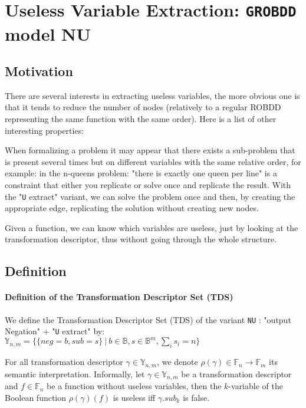 \documentclass[a4paper,10pt]{article}
\newcommand{\B}{\mathbb{B}}
\newcommand{\F}{\mathbb{F}}
\newcommand{\Y}{\mathbb{Y}}
\newcommand{\uextract}{"\texttt{U} extract"}
\newcommand{\GroBdd}{\texttt{GROBDD}}
\begin{document}
\section{Useless Variable Extraction: \GroBdd{} model NU}

\subsection{Motivation}

There are several interests in extracting useless variables, the more obvious one is that it tends to reduce the number of nodes (relatively to a regular ROBDD representing the same function with the same order).
Here is a list of other interesting properties: \begin{compactitem}
\item When formalizing a problem it may appear that there exists a sub-problem that is present several times but on different variables with the same relative order, for example: in the n-queens problem: "there is exactly one queen per line" is a constraint that either you replicate or solve once and replicate the result.
With the \uextract{} variant, we can solve the problem once and then, by creating the appropriate edge, replicating the solution without creating new nodes.
\item Given a function, we can know which variables are useless, just by looking at the transformation descriptor, thus without going through the whole structure.
\end{compactitem}

\subsection{Definition}

\paragraph{Definition of the Transformation Descriptor Set (TDS)}

We define the Transformation Descriptor Set (TDS) of the variant \texttt{NU} : "output Negation" + \uextract{} by: $\Y_{n, m} = \{\{neg = b, sub = s\}~|~ b\in\B, s\in\B^m, \sum_i s_i = n\}$

For all transformation descriptor $\gamma\in\Y_{n, m}$, we denote $\rho(\gamma) \in \F_n \rightarrow \F_m$ its semantic interpretation.
Informally, let $\gamma\in\Y_{n, m}$ be a transformation descriptor and $f\in\F_n$ be a function without useless variables, then the $k$-variable of the Boolean function $\rho(\gamma)(f)$ is useless iff $\gamma.sub_k$ is false.
\end{document}
